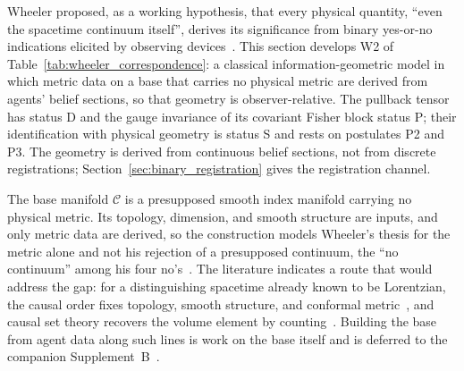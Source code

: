 Wheeler proposed, as a working hypothesis, that every physical quantity, ``even the spacetime continuum itself'', derives its significance from binary yes-or-no indications elicited by observing devices~\cite{Wheeler1990}. This section develops W2 of Table~\ref{tab:wheeler_correspondence}: a classical information-geometric model in which metric data on a base that carries no physical metric are derived from agents' belief sections, so that geometry is observer-relative. The pullback tensor has status D and the gauge invariance of its covariant Fisher block status P; their identification with physical geometry is status S and rests on postulates P2 and P3. The geometry is derived from continuous belief sections, not from discrete registrations; Section~\ref{sec:binary_registration} gives the registration channel.

The base manifold $\mathcal{C}$ is a presupposed smooth index manifold carrying no physical metric. Its topology, dimension, and smooth structure are inputs, and only metric data are derived, so the construction models Wheeler's thesis for the metric alone and not his rejection of a presupposed continuum, the ``no continuum'' among his four no's~\cite{Wheeler1990}. The literature indicates a route that would address the gap: for a distinguishing spacetime already known to be Lorentzian, the causal order fixes topology, smooth structure, and conformal metric~\cite{HawkingKingMcCarthy1976, Malament1977}, and causal set theory recovers the volume element by counting~\cite{BombelliLeeMeyerSorkin1987}. Building the base from agent data along such lines is work on the base itself and is deferred to the companion Supplement~B~\cite{DennisGaugeVFESuppB2026}.

